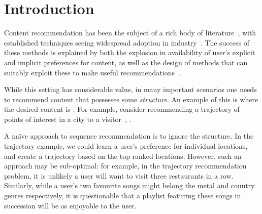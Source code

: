 
\secmoveup
\section{Introduction}
\label{sec:intro}
\textmoveup

Content recommendation has been the subject of a rich body of literature~\citep{Goldberg:1992,Sarwar:2001,Koren:2010},
with established techniques seeing widespread adoption in industry~\citep{Linden:2003,Agarwal:2013,Amatriain:2015,Gomez-Uribe:2015}.
The success of these methods is explained by both the explosion in availability of user's explicit and implicit preferences for content,
as well as the design of methods that can suitably exploit these to make useful recommendations~\citep{Koren:2009}.

While this setting has considerable value,
in many important scenarios one needs to recommend content that possesses some \emph{structure}.
An example of this is where the desired content is .
For example, consider %
recommending a trajectory of points of interest in a city to a visitor~\citep{lu2010photo2trip,lu2012personalized,ijcai15,cikm16paper}, . 
%

A na\"{i}ve approach to sequence recommendation is to ignore the structure.
In the trajectory example, we could learn a user's preference for individual locations,
and create a trajectory based on the top ranked locations.
However, such an approach may be sub-optimal:
for example,
in the trajectory recommendation problem, it is unlikely a user will want to visit three restaurants in a row.
Similarly, 
while a user's two favourite songs might belong
the metal and country genres respectively,
it is questionable that a playlist featuring these songs in succession will be as enjoyable to the user.

